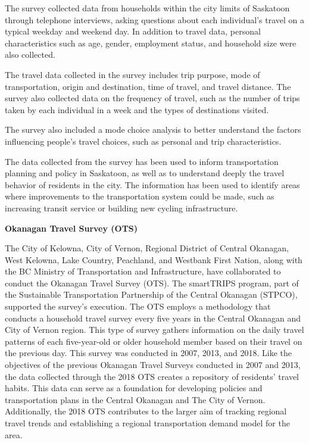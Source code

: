 \documentclass[
11pt, %
oneside, %
english, %
singlespacing, %
]{macthesis} %
\begin{document}
The survey collected data from households within the city limits of Saskatoon through telephone interviews, asking questions about each individual's travel on a typical weekday and weekend day. In addition to travel data, personal characteristics such as age, gender, employment status, and household size were also collected.

The travel data collected in the survey includes trip purpose, mode of transportation, origin and destination, time of travel, and travel distance. The survey also collected data on the frequency of travel, such as the number of trips taken by each individual in a week and the types of destinations visited.

The survey also included a mode choice analysis to better understand the factors influencing people's travel choices, such as personal and trip characteristics.

The data collected from the survey has been used to inform transportation planning and policy in Saskatoon, as well as to understand deeply the travel behavior of residents in the city. The information has been used to identify areas where improvements to the transportation system could be made, such as increasing transit service or building new cycling infrastructure.

\textbf{Okanagan Travel Survey (OTS)}

The City of Kelowna, City of Vernon, Regional District of Central Okanagan, West Kelowna, Lake Country, Peachland, and Westbank First Nation, along with the BC Ministry of Transportation and Infrastructure, have collaborated to conduct the Okanagan Travel Survey (OTS). The smartTRIPS program, part of the Sustainable Transportation Partnership of the Central Okanagan (STPCO), supported the survey's execution. The OTS employs a methodology that conducts a household travel survey every five years in the Central Okanagan and City of Vernon region. This type of survey gathers information on the daily travel patterns of each five-year-old or older household member based on their travel on the previous day. This survey was conducted in 2007, 2013, and 2018. Like the objectives of the previous Okanagan Travel Surveys conducted in 2007 and 2013, the data collected through the 2018 OTS creates a repository of residents' travel habits. This data can serve as a foundation for developing policies and transportation plans in the Central Okanagan and The City of Vernon. Additionally, the 2018 OTS contributes to the larger aim of tracking regional travel trends and establishing a regional transportation demand model for the area.
\end{document}
